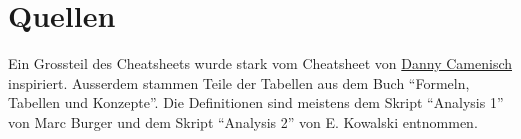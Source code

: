 \documentclass[a4paper,10pt]{article}
\begin{document}
\endgroup
\section{Quellen}
Ein Grossteil des Cheatsheets wurde stark vom Cheatsheet von \href{https://github.com/dannycamenisch}{Danny Camenisch} inspiriert. Ausserdem stammen Teile der Tabellen aus dem Buch ``Formeln, Tabellen und Konzepte''. Die Definitionen sind meistens dem Skript ``Analysis 1'' von Marc Burger und dem Skript ``Analysis 2'' von E. Kowalski entnommen.
\end{document}
